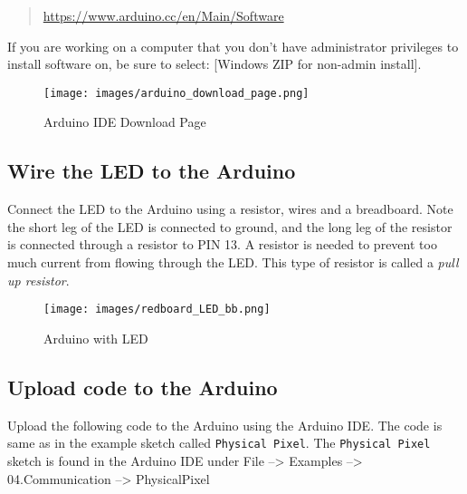 \documentclass{book}
\makeatletter
\def\maxwidth{\ifdim\Gin@nat@width>\linewidth\linewidth
\else\Gin@nat@width\fi}
\let\Oldincludegraphics\includegraphics
\renewcommand{\includegraphics}[1]{\Oldincludegraphics[width=.8\maxwidth]{#1}}
\newcommand{\passthrough}[1]{#1}
\makeatother
\begin{document}
\begin{quote}
\url{https://www.arduino.cc/en/Main/Software}
\end{quote}

If you are working on a computer that you don't have administrator
privileges to install software on, be sure to select: {[}Windows ZIP for
non-admin install{]}.

\begin{figure}
\centering
\texttt{[image: images/arduino\_download\_page.png]}
\caption{Arduino IDE Download Page}
\end{figure}
    




    
        \hypertarget{wire-the-led-to-the-arduino}{%
\subsection{Wire the LED to the
Arduino}\label{wire-the-led-to-the-arduino}}
    




    
        Connect the LED to the Arduino using a resistor, wires and a breadboard.
Note the short leg of the LED is connected to ground, and the long leg
of the resistor is connected through a resistor to PIN 13. A resistor is
needed to prevent too much current from flowing through the LED. This
type of resistor is called a \emph{pull up resistor}.
    




    
        \begin{figure}
\centering
\texttt{[image: images/redboard\_LED\_bb.png]}
\caption{Arduino with LED}
\end{figure}
    




    
        \hypertarget{upload-code-to-the-arduino}{%
\subsection{Upload code to the
Arduino}\label{upload-code-to-the-arduino}}
    




    
        Upload the following code to the Arduino using the Arduino IDE. The code
is same as in the example sketch called
\passthrough{\lstinline!Physical Pixel!}. The
\passthrough{\lstinline!Physical Pixel!} sketch is found in the Arduino
IDE under File --\textgreater{} Examples --\textgreater{}
04.Communication --\textgreater{} PhysicalPixel
\end{document}
